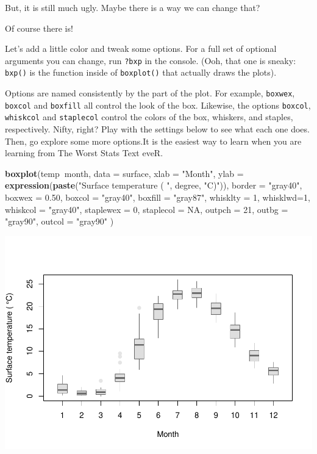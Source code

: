 \documentclass[
]{book}
\newenvironment{Shaded}{\begin{snugshade}}{\end{snugshade}}
\newcommand{\DataTypeTok}[1]{\textcolor[rgb]{0.13,0.29,0.53}{#1}}
\newcommand{\DecValTok}[1]{\textcolor[rgb]{0.00,0.00,0.81}{#1}}
\newcommand{\FloatTok}[1]{\textcolor[rgb]{0.00,0.00,0.81}{#1}}
\newcommand{\KeywordTok}[1]{\textcolor[rgb]{0.13,0.29,0.53}{\textbf{#1}}}
\newcommand{\NormalTok}[1]{#1}
\newcommand{\OperatorTok}[1]{\textcolor[rgb]{0.81,0.36,0.00}{\textbf{#1}}}
\newcommand{\OtherTok}[1]{\textcolor[rgb]{0.56,0.35,0.01}{#1}}
\newcommand{\StringTok}[1]{\textcolor[rgb]{0.31,0.60,0.02}{#1}}
\begin{document}
But, it is still much ugly. Maybe there is a way we can change that?

Of course there is!

Let's add a little color and tweak some options. For a full set of optional arguments you can change, run \texttt{?bxp} in the console. (Ooh, that one is sneaky: \texttt{bxp()} is the function inside of \texttt{boxplot()} that actually draws the plots).

Options are named consistently by the part of the plot. For example, \texttt{boxwex}, \texttt{boxcol} and \texttt{boxfill} all control the look of the box. Likewise, the options \texttt{boxcol}, \texttt{whiskcol} and \texttt{staplecol} control the colors of the box, whiskers, and staples, respectively. Nifty, right? Play with the settings below to see what each one does. Then, go explore some more options.It is the easiest way to learn when you are learning from The Worst Stats Text eveR.

\begin{Shaded}
\begin{Highlighting}[]
\KeywordTok{boxplot}\NormalTok{(temp}\OperatorTok{~}\NormalTok{month, }
        \DataTypeTok{data =}\NormalTok{ surface,}
        \DataTypeTok{xlab =} \StringTok{"Month"}\NormalTok{,}
        \DataTypeTok{ylab =} \KeywordTok{expression}\NormalTok{(}\KeywordTok{paste}\NormalTok{(}\StringTok{"Surface temperature ( "}\NormalTok{, degree, }\StringTok{"C)"}\NormalTok{)),      }
        \DataTypeTok{border =} \StringTok{"gray40"}\NormalTok{,}
        \DataTypeTok{boxwex =} \FloatTok{0.50}\NormalTok{, }\DataTypeTok{boxcol =} \StringTok{"gray40"}\NormalTok{, }\DataTypeTok{boxfill =} \StringTok{"gray87"}\NormalTok{,}
        \DataTypeTok{whisklty =} \DecValTok{1}\NormalTok{, }\DataTypeTok{whisklwd=}\DecValTok{1}\NormalTok{, }\DataTypeTok{whiskcol =} \StringTok{"gray40"}\NormalTok{,}
        \DataTypeTok{staplewex =} \DecValTok{0}\NormalTok{, }\DataTypeTok{staplecol =} \OtherTok{NA}\NormalTok{,}
        \DataTypeTok{outpch =} \DecValTok{21}\NormalTok{, }\DataTypeTok{outbg =} \StringTok{"gray90"}\NormalTok{, }\DataTypeTok{outcol =} \StringTok{"gray90"}
\NormalTok{        )}
\end{Highlighting}
\end{Shaded}

\includegraphics{worstr_files/figure-latex/unnamed-chunk-97-1.pdf}
\end{document}

